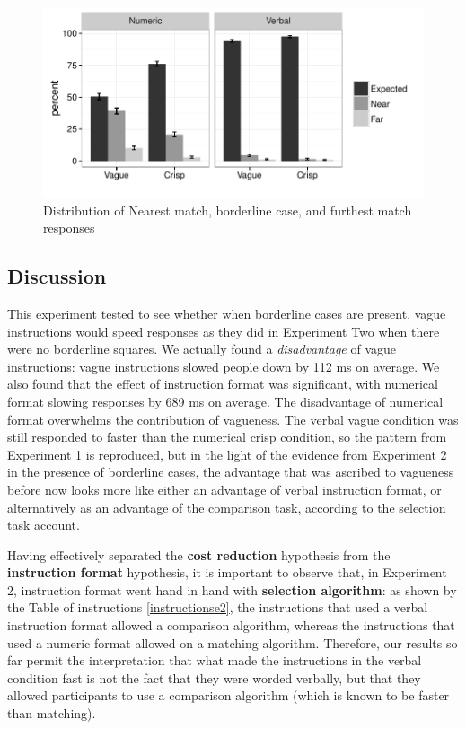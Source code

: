 \documentclass[
a4paper 
, doc
, longtable
]{apa6}
\begin{document}
\begin{figure}[htbp]
\centering
\includegraphics[]{images/histbd4-ggplot-version-1.pdf}
\caption{Distribution of Nearest match, borderline case, and furthest match responses}
\label{borderline-response-distribution-e2}
\end{figure}


\subsection{Discussion}

This experiment tested to see whether when borderline cases are present, vague instructions would speed responses as they did in Experiment Two when there were no borderline squares. We actually found a \emph{disadvantage} of vague instructions: vague instructions slowed people down by 112 ms on average. We also found that the effect of instruction format was significant, with numerical format slowing responses by 689 ms on average. The disadvantage of numerical format overwhelms the contribution of vagueness. The verbal vague condition was still responded to faster than the numerical crisp condition, so the pattern from Experiment 1 is reproduced, but in the light of the evidence from Experiment 2 in the presence of borderline cases, the advantage that was ascribed to vagueness before now looks more like either an advantage of verbal instruction format, or alternatively as an advantage of the comparison task, according to the selection task account.

Having effectively separated the {\bf cost reduction} hypothesis from the {\bf instruction format} hypothesis, it is important to observe that, in Experiment 2, instruction format went hand in hand with {\bf selection algorithm}: as shown by the Table of instructions \ref{instructionse2}, the instructions that used a verbal instruction format allowed a comparison algorithm, whereas the instructions that used a numeric format allowed on a matching algorithm. Therefore, our results so far permit the interpretation that what made the instructions in the verbal condition fast is not the fact that they were worded verbally, but that they allowed participants to use a comparison algorithm (which is known to be faster than matching). %
\end{document}
